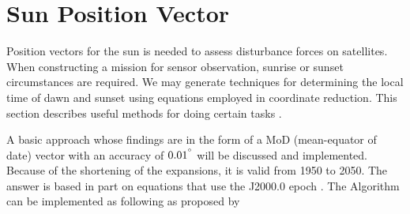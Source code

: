 \section{Sun Position Vector}
 Position vectors for the sun is needed to assess disturbance forces on satellites. When constructing a mission for sensor observation, sunrise or sunset circumstances are required. We may generate techniques for determining the local time of dawn and sunset using equations employed in coordinate reduction. This section describes useful methods for doing certain tasks \cite{vallado2001fundamentals}. 
 
 A basic approach whose findings are in the form of a MoD (mean-equator of date) vector with an accuracy of $0.01^{\degree}$ will be discussed and implemented. Because of the shortening of the expansions, it is valid from 1950 to 2050. The answer is based in part on equations that use the J2000.0 epoch \cite{vallado2001fundamentals}.
 The Algorithm can be implemented as following as proposed by \cite{vallado2001fundamentals}
